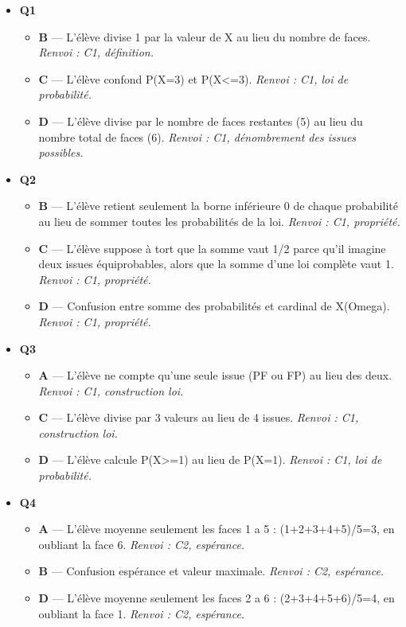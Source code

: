\begin{itemize}
  \item \textbf{Q1}
  \begin{itemize}
    \item \textbf{B} — L'élève divise 1 par la valeur de X au lieu du nombre de faces. \emph{Renvoi : C1, définition.}
    \item \textbf{C} — L'élève confond P(X=3) et P(X<=3). \emph{Renvoi : C1, loi de probabilité.}
    \item \textbf{D} — L'élève divise par le nombre de faces restantes (5) au lieu du nombre total de faces (6). \emph{Renvoi : C1, dénombrement des issues possibles.}
  \end{itemize}
  \item \textbf{Q2}
  \begin{itemize}
    \item \textbf{B} — L'élève retient seulement la borne inférieure 0 de chaque probabilité au lieu de sommer toutes les probabilités de la loi. \emph{Renvoi : C1, propriété.}
    \item \textbf{C} — L'élève suppose à tort que la somme vaut 1/2 parce qu'il imagine deux issues équiprobables, alors que la somme d'une loi complète vaut 1. \emph{Renvoi : C1, propriété.}
    \item \textbf{D} — Confusion entre somme des probabilités et cardinal de X(Omega). \emph{Renvoi : C1, propriété.}
  \end{itemize}
  \item \textbf{Q3}
  \begin{itemize}
    \item \textbf{A} — L'élève ne compte qu'une seule issue (PF ou FP) au lieu des deux. \emph{Renvoi : C1, construction loi.}
    \item \textbf{C} — L'élève divise par 3 valeurs au lieu de 4 issues. \emph{Renvoi : C1, construction loi.}
    \item \textbf{D} — L'élève calcule P(X>=1) au lieu de P(X=1). \emph{Renvoi : C1, loi de probabilité.}
  \end{itemize}
  \item \textbf{Q4}
  \begin{itemize}
    \item \textbf{A} — L'élève moyenne seulement les faces 1 a 5 : (1+2+3+4+5)/5=3, en oubliant la face 6. \emph{Renvoi : C2, espérance.}
    \item \textbf{B} — Confusion espérance et valeur maximale. \emph{Renvoi : C2, espérance.}
    \item \textbf{D} — L'élève moyenne seulement les faces 2 a 6 : (2+3+4+5+6)/5=4, en oubliant la face 1. \emph{Renvoi : C2, espérance.}

\end{itemize}
\end{itemize}
